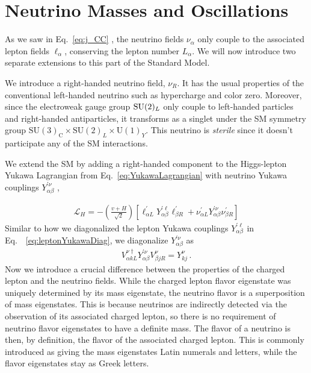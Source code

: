 \documentclass[draft=True]{revtex4-2}
\begin{document}
\section{Neutrino Masses and Oscillations}\label{ch:oscillation}
As we saw in Eq.~\ref{eq:j_CC}
, the neutrino fields $\nu_\alpha$ only couple to the associated lepton fields $\ell_\alpha$, conserving the lepton number $L_\alpha$. We will now introduce two separate extensions to this part of the Standard Model.

We introduce a right-handed neutrino field, $\nu_R$. It has the usual properties of the conventional left-handed neutrino such as hypercharge and color zero. Moreover, since the electroweak gauge group $\text{{SU}}(2)_L$ only couple to left-handed particles and right-handed antiparticles, it transforms as a singlet under the SM symmetry group $\mathrm{SU}(3)_{\mathrm{C}} \times \mathrm{SU}(2)_{L} \times \mathrm{U}(1)_{Y}$. This neutrino is \emph{sterile} since it doesn't participate any of the SM interactions. 

We extend the SM by adding a right-handed component to the Higgs-lepton Yukawa Lagrangian from Eq.~\ref{eq:YukawaLagrangian} with neutrino Yukawa couplings $Y_{\alpha \beta}^{\prime \nu}$ ,

\begin{align}
    \mathcal{L}_{H}=-\left( \frac{v + H}{\sqrt{2}} \right) \left[\ell_{\alpha L}^{\prime} Y_{\alpha \beta}^{\prime \ell} \ell_{\beta R}^{\prime} + \nu_{\alpha L}^{\prime} Y_{\alpha \beta}^{\prime \nu} \nu_{\beta R}^{\prime}\right]
\end{align}
Similar to how we diagonalized the lepton Yukawa couplings $Y_{\alpha \beta}^{\prime \ell}$ in Eq.~~\ref{eq:leptonYukawaDiag}, we diagonalize $Y_{\alpha \beta}^{\prime \nu}$ as
\begin{align}
    V_{\alpha k L}^{\nu \dagger} Y^{\prime \nu}_{\alpha \beta} V_{\beta j R}^{\nu}=Y^{\nu}_{kj} \,.
\end{align}
Now we introduce a crucial difference between the properties of the charged lepton and the neutrino fields.
While the charged lepton flavor eigenstate was uniquely determined by its mass eigenstate, the neutrino flavor is a superposition of mass eigenstates. This is because neutrinos are indirectly detected via the observation of its associated charged lepton, so there is no requirement of neutrino flavor eigenstates to have a definite mass. The flavor of a neutrino is then, by definition, the flavor of the associated charged lepton. This is commonly introduced as giving the mass eigenstates Latin numerals and letters, while the flavor eigenstates stay as Greek letters.
\end{document}
